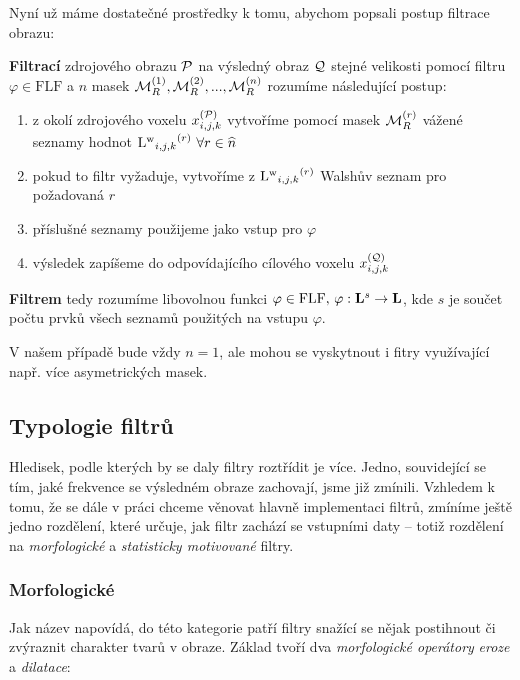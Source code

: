     Nyní už máme dostatečné prostředky k tomu, abychom popsali postup filtrace obrazu:
    \begin{define}\label{def filtr}
      \textbf{Filtrací} zdrojového obrazu $\mathcal{P}$ na výsledný obraz $\mathcal{Q}$ stejné velikosti pomocí filtru $\varphi \in \mathrm{FLF}$ a $n$ masek $\mathcal{M}_R^{(1)},\mathcal{M}_R^{(2)},...,\mathcal{M}_R^{(n)}$ rozumíme následující postup:
      \begin{enumerate}
      \item z okolí zdrojového voxelu $x_{i,j,k}^{(\mathcal{P})}$ vytvoříme pomocí masek $\mathcal{M}_R^{(r)}$ vážené seznamy hodnot ${\mathrm{L^w}_{i,j,k}}^{(r)} \,\, \forall r \in \widehat n$
      \item pokud to filtr vyžaduje, vytvoříme z ${\mathrm{L^w}_{i,j,k}}^{(r)}$ Walshův seznam pro požadovaná $r$
      \item příslušné seznamy použijeme jako vstup pro $\varphi$
      \item výsledek zapíšeme do odpovídajícího cílového voxelu $x_{i,j,k}^{(\mathcal{Q})}$
      \end{enumerate}
      \textbf{Filtrem} tedy rozumíme libovolnou funkci $\varphi \in \mathrm{FLF}, \,\varphi : \mathbf{L}^s \rightarrow \mathbf{L}$, kde $s$ je součet počtu prvků všech seznamů použitých na vstupu $\varphi$.
    \end{define}

    V našem případě bude vždy $n = 1$, ale mohou se vyskytnout i fitry využívající např. více asymetrických masek.

    \subsection{Typologie filtrů}\label{Typologie}       %

    Hledisek, podle kterých by se daly filtry roztřídit je více. Jedno, souvidející se tím, jaké frekvence se výsledném obraze zachovají, jsme již zmínili. Vzhledem k tomu, že se dále v práci chceme věnovat hlavně implementaci filtrů, zmíníme ještě jedno rozdělení, které určuje, jak filtr zachází se vstupními daty -- totiž rozdělení na \emph{morfologické} a \emph{statisticky motivované} filtry.

        \subsubsection{Morfologické}\label{sec morph}
        Jak název napovídá, do této kategorie patří filtry snažící se nějak postihnout či zvýraznit charakter tvarů v obraze. Základ tvoří dva \emph{morfologické operátory} \emph{eroze} a \emph{dilatace}:

